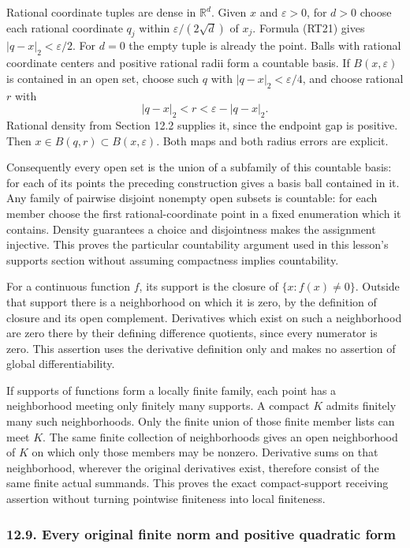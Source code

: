 \documentclass[
  11pt,
]{article}
\begin{document}
Rational coordinate tuples are dense in \(\mathbb R^d\). Given \(x\) and
\(\varepsilon>0\), for \(d>0\) choose each rational coordinate \(q_j\)
within \(\varepsilon/(2\sqrt d)\) of \(x_j\). Formula (RT21) gives
\(|q-x|_2<\varepsilon/2\). For \(d=0\) the empty tuple is already the
point. Balls with rational coordinate centers and positive rational
radii form a countable basis. If \(B(x,\varepsilon)\) is contained in an
open set, choose such \(q\) with \(|q-x|_2<\varepsilon/4\), and choose
rational \(r\) with \[
|q-x|_2<r<\varepsilon-|q-x|_2.
\tag{RT31}
\] Rational density from Section 12.2 supplies it, since the endpoint
gap is positive. Then \(x\in B(q,r)\subset B(x,\varepsilon)\). Both maps
and both radius errors are explicit.

Consequently every open set is the union of a subfamily of this
countable basis: for each of its points the preceding construction gives
a basis ball contained in it. Any family of pairwise disjoint nonempty
open subsets is countable: for each member choose the first
rational-coordinate point in a fixed enumeration which it contains.
Density guarantees a choice and disjointness makes the assignment
injective. This proves the particular countability argument used in this
lesson's supports section without assuming compactness implies
countability.

For a continuous function \(f\), its support is the closure of
\(\{x:f(x)\ne0\}\). Outside that support there is a neighborhood on
which it is zero, by the definition of closure and its open complement.
Derivatives which exist on such a neighborhood are zero there by their
defining difference quotients, since every numerator is zero. This
assertion uses the derivative definition only and makes no assertion of
global differentiability.

If supports of functions form a locally finite family, each point has a
neighborhood meeting only finitely many supports. A compact \(K\) admits
finitely many such neighborhoods. Only the finite union of those finite
member lists can meet \(K\). The same finite collection of neighborhoods
gives an open neighborhood of \(K\) on which only those members may be
nonzero. Derivative sums on that neighborhood, wherever the original
derivatives exist, therefore consist of the same finite actual summands.
This proves the exact compact-support receiving assertion without
turning pointwise finiteness into local finiteness.

\subsubsection{12.9. Every original finite norm and positive quadratic
form}\label{every-original-finite-norm-and-positive-quadratic-form}
\end{document}
